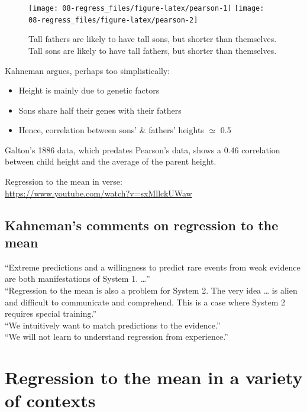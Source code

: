 \documentclass[
  10pt,
  b5paper]{book}
\providecommand{\tightlist}{%
  \setlength{\itemsep}{0pt}\setlength{\parskip}{0pt}}
\begin{document}
\begin{figure}
\texttt{[image: 08-regress\_files/figure-latex/pearson-1]} \texttt{[image: 08-regress\_files/figure-latex/pearson-2]} \caption{Tall fathers are likely to have tall sons, but shorter than themselves. 
Tall sons are likely to have tall fathers, but shorter than themselves.}\label{fig:pearson}
\end{figure}

Kahneman argues, perhaps too simplistically:

\begin{itemize}
\tightlist
\item
  Height is mainly due to genetic factors
\item
  Sons share half their genes with their fathers
\item
  Hence, correlation between sons' \& fathers' heights \(\simeq\) 0.5
\end{itemize}

\enlargethispage{21pt}

Galton's 1886 data, which predates Pearson's data, shows a 0.46
correlation between child height and the average of the parent
height.

Regression to the mean in verse:\\
\url{https://www.youtube.com/watch?v=sxMllckUWaw}

\hypertarget{kahnemans-comments-on-regression-to-the-mean}{%
\subsection*{Kahneman's comments on regression to the mean}\label{kahnemans-comments-on-regression-to-the-mean}}

``Extreme predictions and a willingness to predict rare events from
weak evidence are both manifestations of System 1. \ldots{}''\\
``Regression to the mean is also a problem for System 2. The very idea
\ldots{} is alien and difficult to communicate and comprehend. This is a
case where System 2 requires special training.''\\
``We intuitively want to match predictions to the evidence.''\\
``We will not learn to understand regression from experience.''

\hypertarget{regression-to-the-mean-in-a-variety-of-contexts}{%
\section{Regression to the mean in a variety of contexts}\label{regression-to-the-mean-in-a-variety-of-contexts}}
\end{document}
